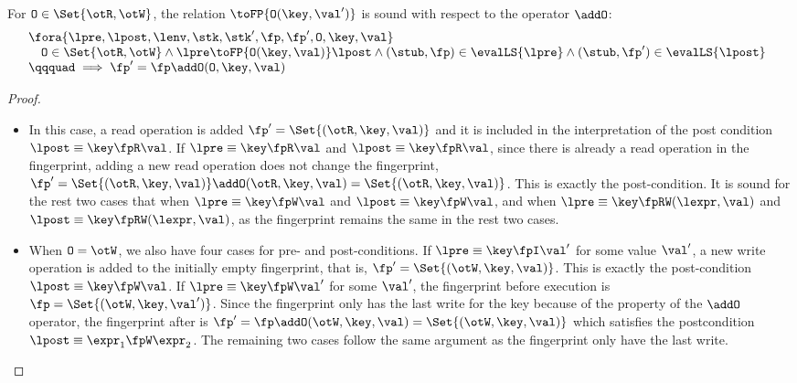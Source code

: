 \begin{lemma}
\label{lem:fingerprint-op}
\label{lem:appendix-fingerprint-op}
For \( \mathtt{O} \in \Set{\otR, \otW} \), the relation \( \toFP{\mathtt{O}(\key,\val')}\) is sound with respect to the operator \( \addO \):
\[
\begin{array}{@{}l}
    \fora{\lpre, \lpost, \lenv, \stk, \stk', \fp, \fp', \mathtt{O}, \key, \val} \\
    \quad \mathtt{O} \in \Set{\otR, \otW} 
    \land \lpre \toFP{\mathtt{O}(\key,\val)} \lpost
    \land (\stub, \fp) \in \evalLS{\lpre}
    \land (\stub, \fp') \in \evalLS{\lpost} \\
    \qqquad \implies \fp' = \fp \addO (\mathtt{O}, \key, \val)
\end{array}
\]
\end{lemma}
\begin{proof}
\begin{itemize}
    \item In this case, a read operation is added \( \fp' = \Set{(\otR, \key, \val)} \) and it is included in the interpretation of the post condition \( \lpost \equiv \key \fpR \val \).
If \( \lpre \equiv \key \fpR \val \) and \( \lpost \equiv \key \fpR \val \), 
since there is already a read operation in the fingerprint, adding a new read operation does not change the fingerprint, \ie \( \fp' = \Set{(\otR, \key, \val)} \addO (\otR, \key, \val ) = \Set{(\otR, \key, \val)} \).
This is exactly the post-condition.
It is sound for the rest two cases that  when \( \lpre \equiv \key \fpW \val \) and \( \lpost \equiv \key \fpW \val \), and when \( \lpre \equiv \key \fpRW (\lexpr,\val) \) and \( \lpost \equiv \key \fpRW (\lexpr,\val) \), as the fingerprint remains the same in the rest two cases.

\item When \( \mathtt{O} = \otW\), we also have four cases for pre- and post-conditions.
If \( \lpre \equiv \key \fpI \val' \) for some value \( \val' \), a new write operation is added to the initially empty fingerprint, that is, \( \fp' = \Set{(\otW, \key, \val)}\).
This is exactly the post-condition \( \lpost \equiv \key \fpW \val \).
If \( \lpre \equiv \key \fpW \val' \) for some \( \val' \), the fingerprint before execution is \( \fp = \Set{(\otW, \key, \val')}\).
Since the fingerprint only has the last write for the key because of the property of the \( \addO \) operator,
the fingerprint after is \( \fp' = \fp \addO (\otW, \key, \val) = \Set{(\otW, \key, \val)}\) which satisfies the postcondition \( \lpost \equiv \expr_{1} \fpW \expr_{2} \).
The remaining two cases follow the same argument as the fingerprint only have the last write.
\end{itemize}
\end{proof}
